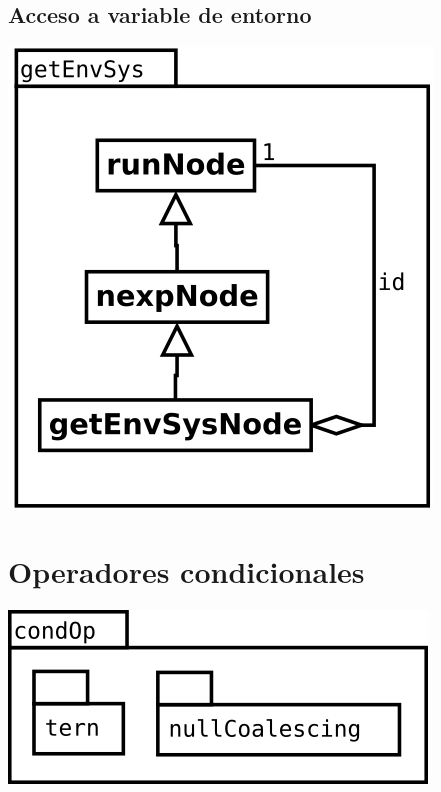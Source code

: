 \subsection {Acceso a variable de entorno} 
\begin{center}
\includegraphics[scale=0.4]{getEnvSys.png} \\
\end{center}

\pagebreak
\section {Operadores condicionales} 
\begin{center}
\includegraphics[scale=0.4]{condOp-package.png} \\
\end{center}

